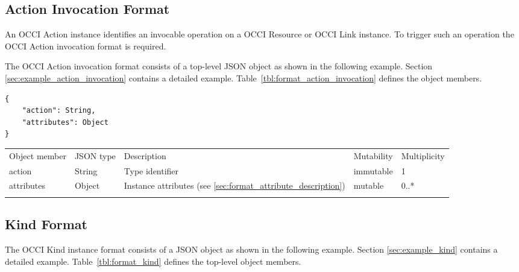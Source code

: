 \documentclass[10pt,a4paper]{article}
\begin{document}
\subsection{Action Invocation Format}
\label{sec:format_action_invocation}

An OCCI Action instance identifies an invocable operation on a OCCI Resource or
OCCI Link instance. To trigger such an operation the OCCI Action invocation
format is required.

The OCCI Action invocation format consists of a top-level JSON object as shown in the
following example. Section \ref{sec:example_action_invocation} contains a detailed example.
Table~\ref{tbl:format_action_invocation} defines the object members.
\begin{lstlisting}
{
    "action": String,
    "attributes": Object
}
\end{lstlisting}
 {
    \begin{tabularx}{\textwidth}{llXll}
    \toprule
    Object member & JSON type & Description & Mutability & Multiplicity \\
    \colrule
    action & String & Type identifier & immutable & 1 \\

    attributes & Object & Instance attributes (see
\ref{sec:format_attribute_description}) & mutable & 0..* \\
    \botrule
    \end{tabularx}
}

\subsection{Kind Format}
\label{sec:format_kind}

The OCCI Kind instance format consists of a JSON object as shown in the
following example. Section \ref{sec:example_kind} contains a detailed example.
Table~\ref{tbl:format_kind} defines the top-level object members.
\end{document}
